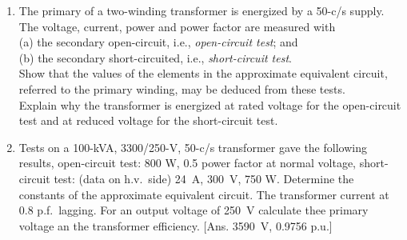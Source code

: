 \documentclass[a4paper,numbers=noenddot,12pt]{scrbook}
\begin{document}
\begin{enumerate}[label={\thechapter.\arabic*},leftmargin=*]
                        Core losses are negligible. \\
                        Derive two forms of equivalent circuit. \\
                        For an angular frequency of 1000 rad/s determine, \\
                        (a) the equivalent impedance for coil 1 with a short-circuit on coil 2, \\
                        (b) the open-circuit voltage of coil 2 with a voltage of \SI{10}{\volt} r.m.s.\ applied to coil 1. \\
                        Use both equivalent circuits to calculate (a) and (b). 
                        [Ans. (a) $25.9 + j 13.3$; (b) $4.47 + j1.12$]

                    \item The primary of a two-winding transformer is energized by a 50-c/s supply. The voltage, current, power and power factor are measured with \\
                        (a) the secondary open-circuit, i.e., \textit{open-circuit test}; and \\
                        (b) the secondary short-circuited, i.e., \textit{short-circuit test}. \\
                        Show that the values of the elements in the approximate equivalent circuit, referred to the primary winding, may be deduced from these tests. \\
                        Explain why the transformer is energized at rated voltage for the open-circuit test and at reduced voltage for the short-circuit test.


                    \item Tests on a 100-kVA, 3300/250-V, 50-c/s transformer gave the following results, 
                        open-circuit test: 800 W, 0.5 power factor at normal voltage, 
                        short-circuit test: (data on h.v.\ side) \SI{24}{\ampere}, \SI{300}{\volt}, 750 W. 
                        Determine the constants of the approximate equivalent circuit. The transformer current at 0.8 p.f.\ lagging. For an output voltage of \SI{250}{\volt} calculate thee primary voltage an the transformer efficiency.
                        [Ans. \SI{3590}{\volt}, 0.9756 p.u.]


\end{enumerate}
\end{document}
